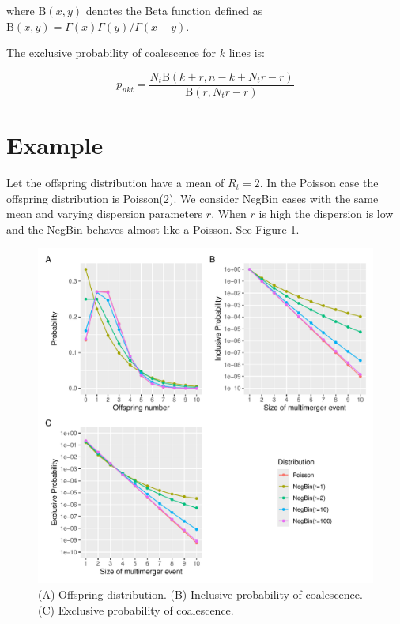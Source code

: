 \documentclass{article}
\begin{document}
\noindent where  $\mathrm{B}(x,y)$ denotes the Beta function defined as $\mathrm{B}(x,y)=\Gamma(x)\Gamma(y)/\Gamma(x+y)$.

The exclusive probability of coalescence for $k$ lines is:

\begin{equation}
p_{nkt}=\frac{N_t \mathrm{B}(k+r, n-k+N_t r-r)}{\mathrm{B}(r, N_t r-r)}
\end{equation}

\section{Example}

Let the offspring distribution have a mean of $R_t=2$. In the Poisson case the offspring distribution is Poisson(2). We consider NegBin cases with the same mean and varying dispersion parameters $r$. When $r$ is high the dispersion is low and the NegBin behaves almost like a Poisson.
See Figure \ref{fig:probs}.

\begin{figure}[t!]
\begin{center}
\includegraphics[width=15cm]{../run/figure.pdf}
\end{center}
\caption{(A) Offspring distribution. (B) Inclusive probability of coalescence. (C) Exclusive probability of coalescence.
\label{fig:probs}}
\end{figure}
\end{document}
